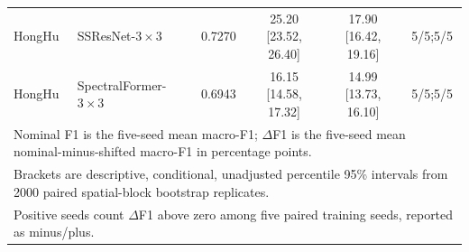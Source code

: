 \begin{table}[!t]
\begin{tabular}{llcccc}
HongHu & SSResNet-$3\times3$ & 0.7270 & 25.20 [23.52, 26.40] & 17.90 [16.42, 19.16] & 5/5;5/5 \\
HongHu & SpectralFormer-$3\times3$ & 0.6943 & 16.15 [14.58, 17.32] & 14.99 [13.73, 16.10] & 5/5;5/5 \\
\hline
\multicolumn{6}{l}{\footnotesize Nominal F1 is the five-seed mean macro-F1; $\Delta$F1 is the five-seed mean nominal-minus-shifted macro-F1 in percentage points.} \\
\multicolumn{6}{l}{\footnotesize Brackets are descriptive, conditional, unadjusted percentile 95\% intervals from 2000 paired spatial-block bootstrap replicates.} \\
\multicolumn{6}{l}{\footnotesize Positive seeds count $\Delta$F1 above zero among five paired training seeds, reported as minus/plus.} \\
\end{tabular}
\end{table}
